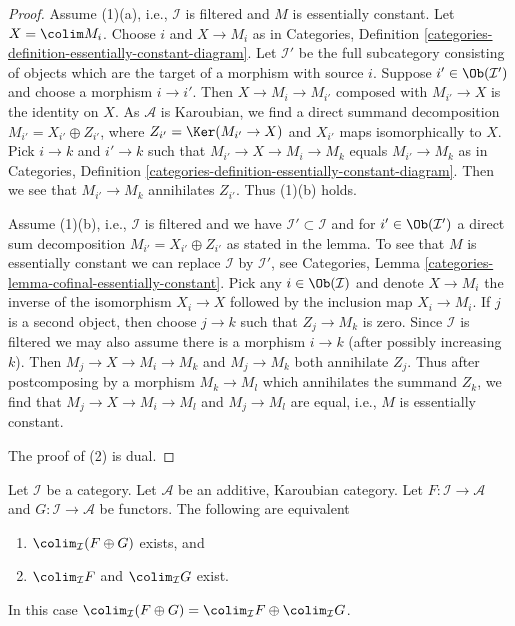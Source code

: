 \begin{proof}
Assume (1)(a), i.e., $\mathcal{I}$ is filtered and $M$ is essentially
constant. Let $X = \colim M_i$. Choose $i$ and $X \to M_i$ as in
Categories, Definition
\ref{categories-definition-essentially-constant-diagram}.
Let $\mathcal{I}'$ be the full subcategory consisting of objects
which are the target of a morphism with source $i$.
Suppose $i' \in \Ob(\mathcal{I}')$ and choose a morphism $i \to i'$.
Then $X \to M_i \to M_{i'}$ composed with $M_{i'} \to X$ is the identity
on $X$. As $\mathcal{A}$ is Karoubian, we find a direct summand
decomposition $M_{i'} = X_{i'} \oplus Z_{i'}$, where
$Z_{i'} = \Ker(M_{i'} \to X)$ and $X_{i'}$ maps isomorphically to $X$.
Pick $i \to k$ and $i' \to k$ such that $M_{i'} \to X \to M_i \to M_k$
equals $M_{i'} \to M_k$ as in Categories, Definition
\ref{categories-definition-essentially-constant-diagram}.
Then we see that $M_{i'} \to M_k$ annihilates $Z_{i'}$.
Thus (1)(b) holds.

\medskip\noindent
Assume (1)(b), i.e., $\mathcal{I}$ is filtered and we have
$\mathcal{I}' \subset \mathcal{I}$ and for $i' \in \Ob(\mathcal{I}')$
a direct sum decomposition $M_{i'} = X_{i'} \oplus Z_{i'}$
as stated in the lemma. To see that $M$ is essentially constant
we can replace $\mathcal{I}$ by $\mathcal{I}'$, see
Categories, Lemma \ref{categories-lemma-cofinal-essentially-constant}.
Pick any $i \in \Ob(\mathcal{I})$
and denote $X \to M_i$ the inverse of the isomorphism $X_i \to X$
followed by the inclusion map $X_i \to M_i$. If $j$ is
a second object, then choose $j \to k$ such that $Z_j \to M_k$ is
zero. Since $\mathcal{I}$ is filtered we may also assume there is
a morphism $i \to k$ (after possibly increasing $k$). Then
$M_j \to X \to M_i \to M_k$ and $M_j \to M_k$ both annihilate $Z_j$.
Thus after postcomposing by a morphism $M_k \to M_l$ which annihilates
the summand $Z_k$, we find that $M_j \to X \to M_i \to M_l$ and
$M_j \to M_l$ are equal, i.e., $M$ is essentially constant.

\medskip\noindent
The proof of (2) is dual.
\end{proof}

\begin{lemma}
\label{lemma-direct-sum-from-product-colimit}
Let $\mathcal{I}$ be a category. Let $\mathcal{A}$ be an additive, Karoubian
category. Let $F : \mathcal{I} \to \mathcal{A}$ and
$G : \mathcal{I} \to \mathcal{A}$ be functors. The following are equivalent
\begin{enumerate}
\item $\colim_\mathcal{I}(F \oplus G)$ exists, and
\item $\colim_\mathcal{I} F$ and $\colim_\mathcal{I} G$ exist.
\end{enumerate}
In this case $\colim_\mathcal{I}(F \oplus G) =
\colim_\mathcal{I} F \oplus \colim_\mathcal{I} G$.
\end{lemma}


